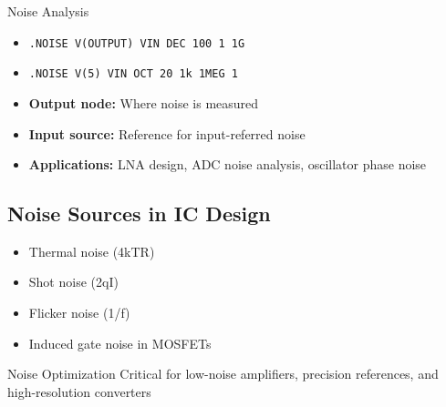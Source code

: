 \documentclass{beamer}
\begin{document}
\begin{frame}{Noise Analysis}
    \begin{itemize}
        \item \texttt{.NOISE V(OUTPUT) VIN DEC 100 1 1G}
        \item \texttt{.NOISE V(5) VIN OCT 20 1k 1MEG 1}
    \end{itemize}
    
    \begin{itemize}
        \item \textbf{Output node:} Where noise is measured
        \item \textbf{Input source:} Reference for input-referred noise
        \item \textbf{Applications:} LNA design, ADC noise analysis, oscillator phase noise
    \end{itemize}
    
    \subsection{Noise Sources in IC Design}
    \begin{itemize}
        \item Thermal noise (4kTR)
        \item Shot noise (2qI)
        \item Flicker noise (1/f)
        \item Induced gate noise in MOSFETs
    \end{itemize}
    
    \begin{exampleblock}{Noise Optimization}
        Critical for low-noise amplifiers, precision references, and high-resolution converters
    \end{exampleblock}
\end{frame}
\end{document}
